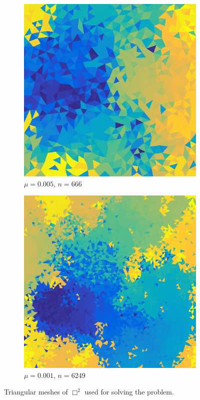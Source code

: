 \documentclass[../fem.tex]{subfile}
\begin{document}
\begin{figure}[htpb]
\begin{subfigure}{0.4\textwidth}
    \centering
    \includegraphics[width=0.8\linewidth]{figures/r1c/tri.png}
    \caption{$\mu=0.005$, $n=666$}
  \end{subfigure}
  \begin{subfigure}{0.4\textwidth}
    \centering
    \includegraphics[width=0.8\linewidth]{figures/r1d/tri.png}
    \caption{$\mu=0.001$, $n=6249$}
  \end{subfigure}
  \caption{Triangular meshes of $\Box^2$ used for solving the problem.}
  \label{fig:b2_mesh}
\end{figure}
\end{document}
